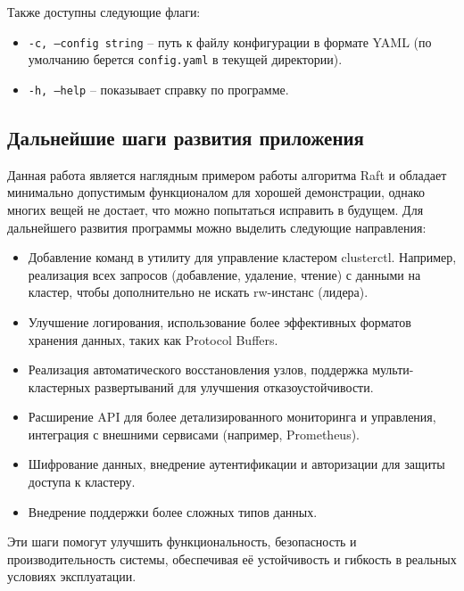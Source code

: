 Также доступны следующие флаги:
\begin{itemize}
    \item \texttt{-c, --config string} -- путь к файлу конфигурации в формате YAML (по умолчанию берется \texttt{config.yaml}
      в текущей директории).
    
    \item \texttt{-h, --help} -- показывает справку по программе.
\end{itemize}

\subsection{Дальнейшие шаги развития приложения}

Данная работа является наглядным примером работы алгоритма Raft и обладает минимально допустимым функционалом для хорошей демонстрации,
однако многих вещей не достает, что можно попытаться исправить в будущем.
Для дальнейшего развития программы можно выделить следующие направления:

\begin{itemize}
    \item Добавление команд в утилиту для управление кластером clusterctl. Например, реализация всех запросов (добавление, удаление, чтение) с
      данными на кластер, чтобы дополнительно не искать rw-инстанс (лидера).
    \item Улучшение логирования, использование более эффективных форматов хранения данных, таких как Protocol Buffers.
    \item Реализация автоматического восстановления узлов, поддержка мульти-кластерных развертываний для улучшения отказоустойчивости.
    \item Расширение API для более детализированного мониторинга и управления, интеграция с внешними сервисами (например, Prometheus).
    \item Шифрование данных, внедрение аутентификации и авторизации для защиты доступа к кластеру.
    \item Внедрение поддержки более сложных типов данных.
\end{itemize}

Эти шаги помогут улучшить функциональность, безопасность и производительность системы, обеспечивая её устойчивость и гибкость в реальных условиях эксплуатации.
